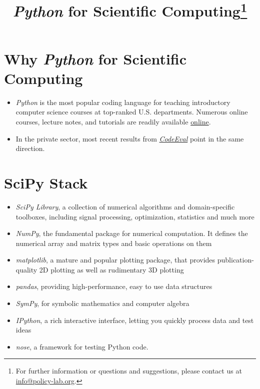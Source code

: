 \documentclass[a4paper,12pt,bold,leqno,fleqn,]{scrartcl}
\title{\textit{Python} for Scientific Computing\thanks{For further information or questions and suggestions, please contact us at \href{mailto: info@policy-lab.org}{info@policy-lab.org}.}}
\author{ }
\date{ }
\renewcommand{\baselinestretch}{1.3}\normalsize
\begin{document}
\maketitle


\vspace{0.5cm}
\renewcommand{\baselinestretch}{1.3}\normalsize 

\setcounter{page}{1}


\thispagestyle{empty}

\section{Why \textit{Python} for Scientific Computing}

\begin{itemize}
\item \textit{Python} is the most popular coding language for teaching introductory computer science courses at top-ranked U.S. departments. Numerous online courses, lecture notes, and tutorials are readily available \href{http://www.fullstackpython.com/best-python-resources.html}{online}.
\item In the private sector, most recent results from \href{https://www.codeeval.com}{\textit{CodeEval}} point in the same direction.
\end{itemize}
\section{SciPy Stack}
\begin{itemize}

\item \textit{SciPy Library}, a collection of numerical algorithms and domain-specific toolboxes, including signal processing, optimization, statistics and much more
\item \textit{NumPy}, the fundamental package for numerical computation. It defines the numerical array and matrix types and basic operations on them
\item \textit{matplotlib}, a mature and popular plotting package, that provides publication-quality 2D plotting as well as rudimentary 3D plotting
\item \textit{pandas}, providing high-performance, easy to use data structures
\item \textit{SymPy}, for symbolic mathematics and computer algebra
\item \textit{IPython}, a rich interactive interface, letting you quickly process data and test ideas
\item \textit{nose}, a framework for testing Python code.
\end{itemize}
\end{document}
